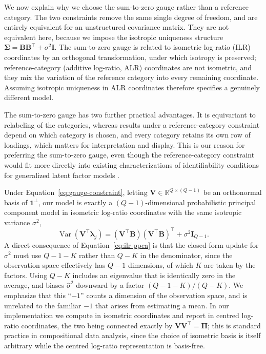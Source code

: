 We now explain why we choose the sum-to-zero gauge rather than a reference category. The two constraints remove the same single degree of freedom, and are entirely equivalent for an unstructured covariance matrix. They are not equivalent here, because we impose the isotropic uniqueness structure $\bm{\Sigma}=\mathbf{B}\mathbf{B}^\top+\sigma^2\mathbf{I}$. The sum-to-zero gauge is related to isometric log-ratio (ILR) coordinates by an orthogonal transformation, under which isotropy is preserved; reference-category (additive log-ratio, ALR) coordinates are not isometric, and they mix the variation of the reference category into every remaining coordinate. Assuming isotropic uniqueness in ALR coordinates therefore specifies a genuinely different model.

The sum-to-zero gauge has two further practical advantages. It is equivariant to relabeling of the categories, whereas results under a reference-category constraint depend on which category is chosen, and every category retains its own row of loadings, which matters for interpretation and display. This is our reason for preferring the sum-to-zero gauge, even though the reference-category constraint would fit more directly into existing characterizations of identifiability conditions for generalized latent factor models \citep{Cui2026}.

Under Equation~\eqref{eq:gauge-constraint}, letting $\mathbf{V}\in\mathbb{R}^{Q\times(Q-1)}$ be an orthonormal basis of $\mathbf{1}^\perp$, our model is exactly a $(Q-1)$-dimensional probabilistic principal component model in isometric log-ratio coordinates with the same isotropic variance $\sigma^2$,
\begin{equation}
\operatorname{Var}(\mathbf{V}^\top\bm{\lambda}_j)=(\mathbf{V}^\top\mathbf{B})(\mathbf{V}^\top\mathbf{B})^\top+\sigma^2\mathbf{I}_{Q-1}.
\label{eq:ilr-ppca}
\end{equation}
A direct consequence of Equation~\eqref{eq:ilr-ppca} is that the closed-form update for $\sigma^2$ must use $Q-1-K$ rather than $Q-K$ in the denominator, since the observation space effectively has $Q-1$ dimensions, of which $K$ are taken by the factors. Using $Q-K$ includes an eigenvalue that is identically zero in the average, and biases $\hat\sigma^2$ downward by a factor $(Q-1-K)/(Q-K)$. We emphasize that this ``$-1$'' counts a dimension of the observation space, and is unrelated to the familiar $-1$ that arises from estimating a mean. In our implementation we compute in isometric coordinates and report in centred log-ratio coordinates, the two being connected exactly by $\mathbf{V}\mathbf{V}^\top=\bm\Pi$; this is standard practice in compositional data analysis, since the choice of isometric basis is itself arbitrary while the centred log-ratio representation is basis-free.

